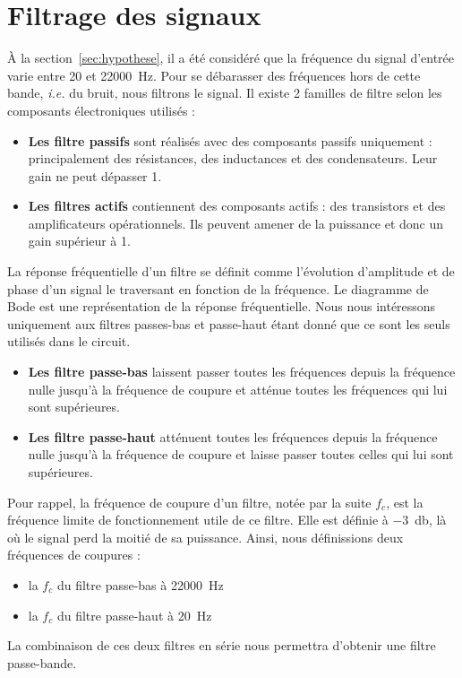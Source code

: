 \documentclass[10pt, oneside, a4paper]{article}
\begin{document}
\section{Filtrage des signaux}
À la section~\ref{sec:hypothese}, il a été considéré que la fréquence du signal d'entrée varie entre \num{20} et \SI{22000}{\hertz}.
Pour se débarasser des fréquences hors de cette bande, \textit{i.e.} du bruit, nous filtrons le signal.
Il existe 2 familles de filtre selon les composants électroniques utilisés :
\begin{itemize}
    \item\textbf{Les filtre passifs} sont réalisés avec des composants passifs uniquement : principalement des résistances, des inductances et des condensateurs.
        Leur gain ne peut dépasser 1.
    \item\textbf{Les filtres actifs} contiennent des composants actifs : des transistors et des amplificateurs opérationnels.
        Ils peuvent amener de la puissance et donc un gain supérieur à 1.
\end{itemize}
La réponse fréquentielle d'un filtre se définit comme l'évolution d'amplitude et de phase d'un signal le traversant en fonction de la fréquence.
Le diagramme de Bode est une représentation de la réponse fréquentielle.
Nous nous intéressons uniquement aux filtres passes-bas et passe-haut étant donné que ce sont les seuls utilisés dans le circuit.
\begin{itemize}
    \item\textbf{Les filtre passe-bas} laissent passer toutes les fréquences depuis
        la fréquence nulle jusqu'à la fréquence de coupure et atténue toutes les
        fréquences qui lui sont supérieures.
    \item\textbf{Les filtre passe-haut} atténuent toutes les fréquences depuis la
        fréquence nulle jusqu'à la fréquence de coupure et laisse passer toutes
        celles qui lui sont supérieures.
\end{itemize}
Pour rappel, la fréquence de coupure d'un filtre, notée par la suite $f_c$, est la fréquence limite de fonctionnement utile de ce filtre.
Elle est définie à \SI{-3}{\decibel}, là où le signal perd la moitié de sa puissance.
Ainsi, nous définissions deux fréquences de coupures :
\begin{itemize}
    \item la $f_c$ du filtre passe-bas à \SI{22000}{\hertz}
    \item la $f_c$ du filtre passe-haut à \SI{20}{\hertz}
\end{itemize}
La combinaison de ces deux filtres en série nous permettra d'obtenir une filtre passe-bande.
\end{document}
